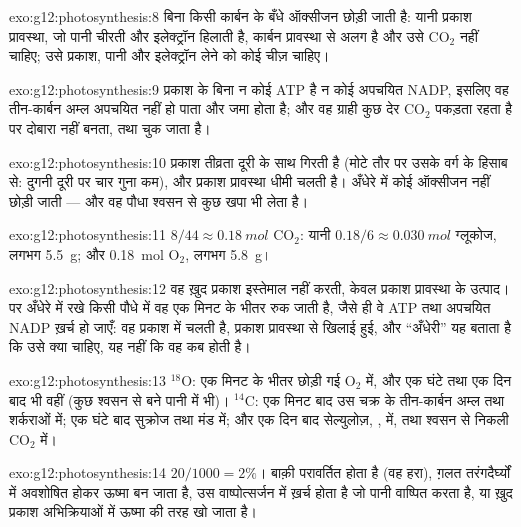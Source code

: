 \begin{solution}{exo:g12:photosynthesis:8}
बिना किसी कार्बन के बँधे ऑक्सीजन छोड़ी जाती है: यानी प्रकाश प्रावस्था, जो
पानी चीरती और इलेक्ट्रॉन हिलाती है, कार्बन प्रावस्था से अलग है और उसे
$\mathrm{CO_2}$ नहीं चाहिए; उसे प्रकाश, पानी और इलेक्ट्रॉन लेने को कोई चीज़
चाहिए।
\end{solution}

\begin{solution}{exo:g12:photosynthesis:9}
प्रकाश के बिना न कोई ATP है न कोई अपचयित NADP, इसलिए वह तीन-कार्बन अम्ल
अपचयित नहीं हो पाता और जमा होता है; और वह ग्राही कुछ देर $\mathrm{CO_2}$
पकड़ता रहता है पर दोबारा नहीं बनता, तथा चुक जाता है।
\end{solution}

\begin{solution}{exo:g12:photosynthesis:10}
प्रकाश तीव्रता दूरी के साथ गिरती है (मोटे तौर पर उसके वर्ग के हिसाब से: दुगनी
दूरी पर चार गुना कम), और प्रकाश प्रावस्था धीमी चलती है। अँधेरे में कोई
ऑक्सीजन नहीं छोड़ी जाती --- और वह पौधा श्वसन से कुछ खपा भी लेता है।
\end{solution}

\begin{solution}{exo:g12:photosynthesis:11}
$8/44 \approx \qty{0.18}{mol}$ $\mathrm{CO_2}$: यानी $0.18/6 \approx
\qty{0.030}{mol}$ ग्लूकोज, लगभग \qty{5.5}{g}; और \qty{0.18}{mol}
$\mathrm{O_2}$, लगभग \qty{5.8}{g}।
\end{solution}

\begin{solution}{exo:g12:photosynthesis:12}
वह ख़ुद प्रकाश इस्तेमाल नहीं करती, केवल प्रकाश प्रावस्था के उत्पाद। पर
अँधेरे में रखे किसी पौधे में वह एक मिनट के भीतर रुक जाती है, जैसे ही वे ATP
तथा अपचयित NADP ख़र्च हो जाएँ: वह प्रकाश में चलती है, प्रकाश प्रावस्था से
खिलाई हुई, और ``अँधेरी'' यह बताता है कि उसे क्या चाहिए, यह नहीं कि वह कब
होती है।
\end{solution}

\begin{solution}{exo:g12:photosynthesis:13}
$^{18}$O: एक मिनट के भीतर छोड़ी गई $\mathrm{O_2}$ में, और एक घंटे तथा एक दिन
बाद भी वहीं (कुछ श्वसन से बने पानी में भी)। $^{14}$C: एक मिनट बाद उस चक्र के
तीन-कार्बन अम्ल तथा शर्कराओं में; एक घंटे बाद सुक्रोज तथा मंड में; और एक दिन
बाद सेल्युलोज़, ,  में, तथा श्वसन से निकली $\mathrm{CO_2}$
में।
\end{solution}

\begin{solution}{exo:g12:photosynthesis:14}
$20/1000 = 2\%$। बाक़ी परावर्तित होता है (वह हरा), ग़लत तरंगदैर्घ्यों में
अवशोषित होकर ऊष्मा बन जाता है, उस वाष्पोत्सर्जन में ख़र्च होता है जो पानी
वाष्पित करता है, या ख़ुद प्रकाश अभिक्रियाओं में ऊष्मा की तरह खो जाता है।
\end{solution}

